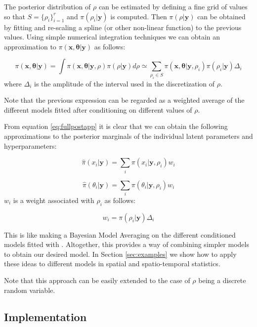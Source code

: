 \documentclass[article]{jss}
\begin{document}
The posterior distribution of $\rho$ can be estimated by defining a fine grid
of values so that $S=\{\rho_i\}_{i=1}^r$ and $\pi(\rho_i|\mathbf{y})$ is
computed.  Then $\pi(\rho|\mathbf{y})$ can be obtained by fitting and
re-scaling a spline (or other non-linear function) to the previous values.
Using simple numerical integration techniques we can obtain an approximation to
$\pi(\mathbf{x}, \mathbf{\theta}|\mathbf{y})$ as follows:

\begin{equation}
\pi(\mathbf{x}, \mathbf{\theta}|\mathbf{y}) = \int \pi(\mathbf{x}, \mathbf{\theta}|\mathbf{y}, \rho)\pi(\rho|\mathbf{y})d\rho
\simeq
\sum_{\rho_i\in S}\pi(\mathbf{x}, \mathbf{\theta}|\mathbf{y}, \rho_i)  
\pi(\rho_i|\mathbf{y}) \Delta_i
\label{eq:fullpostapp}
\end{equation}
\noindent
where $\Delta_i$ is the amplitude of the interval used in the discretization
of $\rho$.

Note that the previous expression can be regarded as a weighted average
of the different models fitted after conditioning on different values of
$\rho$.

From equation \ref{eq:fullpostapp} it is clear that we can obtain the following
approximations to the posterior marginals of the individual latent parameters
and hyperparameters:

$$
\hat{\pi}(x_i|\mathbf{y}) = \sum_i \pi(x_i|\mathbf{y}, \rho_i) w_i
$$

$$
\hat{\pi}(\theta_i|\mathbf{y}) = \sum_i \pi(\theta_i|\mathbf{y}, \rho_i) w_i
$$
\noindent
$w_i$ is a weight associated with $\rho_i$ as follows:

$$
w_i = \pi(\rho_i|\mathbf{y})\Delta_i
$$

This is like making a Bayesian Model Averaging \citep{Hoetingetal:1999} on the
different conditioned models fitted with . Altogether, this
provides a way of combining simpler models to obtain our desired model. In
Section \ref{sec:examples} we show how to apply these ideas to different models
in spatial and spatio-temporal statistics.


%

Note that this approach can be easily extended to the case of $\rho$ being
a discrete random variable.


\subsection{Implementation}
\end{document}
